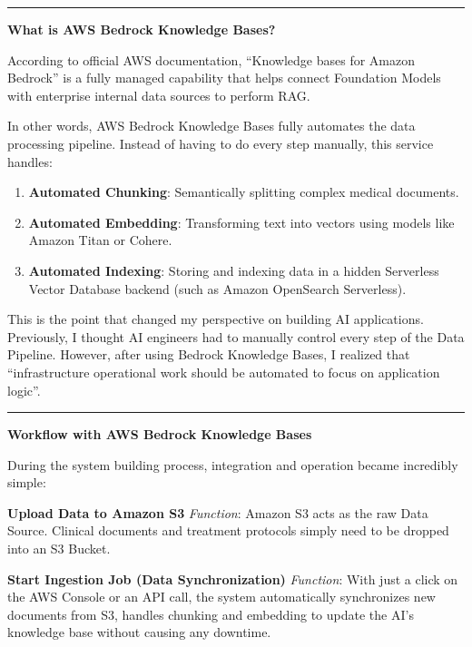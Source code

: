 \begin{center}\rule{0.5\linewidth}{0.5pt}\end{center}

\vspace{0.5em}\noindent\textbf{What is AWS Bedrock Knowledge Bases?}

According to official AWS documentation, ``Knowledge bases for Amazon
Bedrock'' is a fully managed capability that helps connect Foundation
Models with enterprise internal data sources to perform RAG.

In other words, AWS Bedrock Knowledge Bases fully automates the data
processing pipeline. Instead of having to do every step manually, this
service handles:

\begin{enumerate}
\def\labelenumi{\arabic{enumi}.}
\tightlist
\item
  \textbf{Automated Chunking}: Semantically splitting complex medical
  documents.
\item
  \textbf{Automated Embedding}: Transforming text into vectors using
  models like Amazon Titan or Cohere.
\item
  \textbf{Automated Indexing}: Storing and indexing data in a hidden
  Serverless Vector Database backend (such as Amazon OpenSearch
  Serverless).
\end{enumerate}

This is the point that changed my perspective on building AI
applications. Previously, I thought AI engineers had to manually control
every step of the Data Pipeline. However, after using Bedrock Knowledge
Bases, I realized that ``infrastructure operational work should be
automated to focus on application logic''.

\begin{center}\rule{0.5\linewidth}{0.5pt}\end{center}

\vspace{0.5em}\noindent\textbf{Workflow with AWS Bedrock Knowledge Bases}

During the system building process, integration and operation became
incredibly simple:

\textbf{Upload Data to Amazon S3} \emph{Function}: Amazon S3 acts as the
raw Data Source. Clinical documents and treatment protocols simply need
to be dropped into an S3 Bucket.

\textbf{Start Ingestion Job (Data Synchronization)} \emph{Function}:
With just a click on the AWS Console or an API call, the system
automatically synchronizes new documents from S3, handles chunking and
embedding to update the AI's knowledge base without causing any
downtime.


